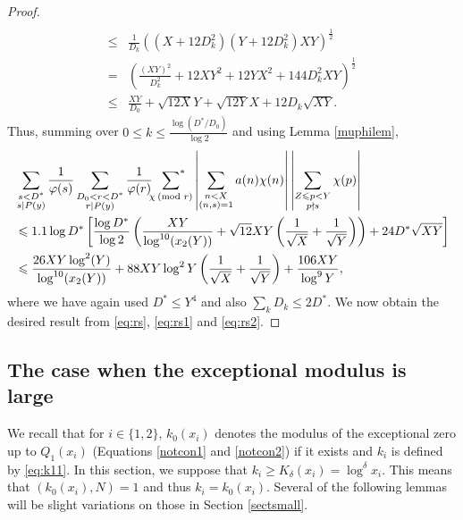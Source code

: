 \documentclass[12pt]{amsart}
\begin{document}
\begin{proof}
\begin{align*}
\\ 
 \le &\frac{1}{D_k}\left((X+12D_k^2)(Y+12D_k^2)XY \right)^{\frac{1}{2}}\\
 = & \left( \frac{(XY)^2}{D_k^2}+12XY^2+12YX^2+144D_k^2XY \right)^{\frac{1}{2}}\\
 \le &\frac{XY}{D_0}+\sqrt{12X}Y+\sqrt{12Y}X+12D_k\sqrt{XY}.
\end{align*}
Thus, summing over $0 \le k \le \frac{\log (D^*/D_0)}{\log 2}$ and using Lemma \ref{muphilem},
\begin{align}
\label{eq:rs2}
 &\sum_{\substack{s<D^*\\s\mid P(y) }}\frac{1}{\varphi(s)} \sum_{\substack{D_0<r<D^* \\ r\mid P(y)}}\frac{1}{\varphi(r)} \sideset{}{^{*}}\sum_{\chi\: (\text{mod }r)}\left|\sum_{\substack{n<X\\ (n,s)=1}}a(n) \chi(n) \right|\left|\sum_{\substack{Z\le p <Y \\ p\nmid s}}\chi(p) \right| \notag\\& \le 1.1\log D^*\left[\frac{\log D^*}{\log 2}\left(\frac{XY}{\log^{10}(x_2(Y))}+\sqrt{12}XY\left(\frac{1}{\sqrt{X}}+\frac{1}{\sqrt{Y}}\right)\right)+24D^*\sqrt{XY}\right]\notag\\
 &\le\frac{26XY\log^2(Y)}{\log^{10}(x_2(Y))}+88XY\log^2Y\left(\frac{1}{\sqrt{X}}+\frac{1}{\sqrt{Y}}\right)+\frac{106XY}{\log^9Y},
\end{align}
where we have again used $D^*\le Y^4$ and also $\sum_kD_k\le 2D^*$. We now obtain the desired result from \eqref{eq:rs}, \eqref{eq:rs1} and \eqref{eq:rs2}.
\end{proof}

\subsection{The case when the exceptional modulus is large}
We recall that for $i\in\{1,2\}$, $k_0(x_i)$ denotes the modulus of the exceptional zero up to $Q_1(x_i)$ (Equations \eqref{notcon1} and \eqref{notcon2}) if it exists and $k_i$ is defined by \eqref{eq:k11}. In this section, we suppose that $k_i\ge K_{\delta}(x_i)=\log^{\delta}x_i$. This means that $(k_0(x_i), N)=1$ and thus $k_i = k_0(x_i)$. Several of the following lemmas will be slight variations on those in Section \ref{sectsmall}.
\end{document}
